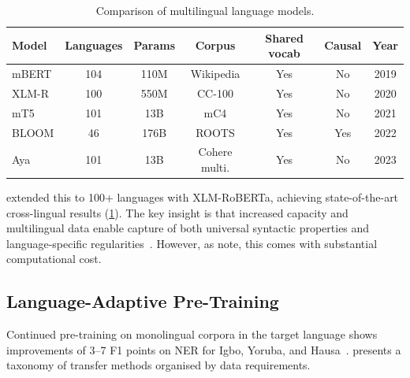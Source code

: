 \documentclass[
    language=english,
    doctype=article,
    institution=none,
    titlestyle=book,
]{../../omnilatex}
\begin{document}
\begin{table}[htbp]
\centering
\caption{Comparison of multilingual language models.}
\label{tab:model-comparison}
\begin{tabular}{lcccccc}
\toprule
\textbf{Model} & \textbf{Languages} & \textbf{Params} & \textbf{Corpus}
    & \textbf{Shared vocab} & \textbf{Causal} & \textbf{Year} \\
\midrule
mBERT    & 104  & 110M  & Wikipedia      & Yes & No  & 2019 \\
XLM-R    & 100  & 550M  & CC-100         & Yes & No  & 2020 \\
mT5      & 101  & 13B   & mC4            & Yes & No  & 2021 \\
BLOOM    & 46   & 176B  & ROOTS          & Yes & Yes & 2022 \\
Aya      & 101  & 13B   & Cohere multi.  & Yes & No  & 2023 \\
\bottomrule
\end{tabular}
\end{table}

\Textcite{conneau2020xlmr} extended this to 100+ languages with XLM-RoBERTa,
achieving state-of-the-art cross-lingual results (\cref{tab:model-comparison}).
The key insight is that increased capacity and multilingual data enable capture
of both universal syntactic properties and language-specific
regularities~\cite{chi2020empirical}.  However, as \parencite{lauscher2020length}
note, this comes with substantial computational cost.

\subsection{Language-Adaptive Pre-Training}
Continued pre-training on monolingual corpora in the target language shows
improvements of 3--7 F1 points on NER for Igbo, Yoruba, and
Hausa~\cite{oguz2021tydi,hu2020xtreme}.   presents a
taxonomy of transfer methods organised by data requirements.
\end{document}
